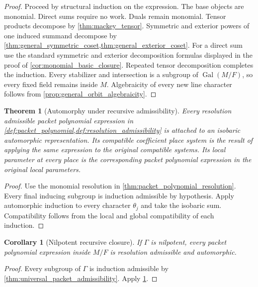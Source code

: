 \documentclass{aomart}
\newtheorem{theorem}{Theorem}[section]
\newtheorem{corollary}[corollary]{Corollary}
\theoremstyle{definition}
\theoremstyle{remark}
\newcommand{\Gal}{\operatorname{Gal}}
\begin{document}
\begin{proof}
Proceed by structural induction on the expression. The base objects are monomial. Direct sums require no work. Duals remain monomial. Tensor products decompose by \cref{thm:mackey_tensor}. Symmetric and exterior powers of one induced summand decompose by \cref{thm:general_symmetric_coset,thm:general_exterior_coset}. For a direct sum use the standard symmetric and exterior decomposition formulas displayed in the proof of \cref{cor:monomial_basic_closure}. Repeated tensor decomposition completes the induction. Every stabilizer and intersection is a subgroup of \(\Gal(M/F)\), so every fixed field remains inside \(M\). Algebraicity of every new line character follows from \cref{prop:general_orbit_algebraicity}.
\end{proof}

\begin{theorem}[Automorphy under recursive admissibility]\label{thm:packet_polynomial_automorphy}
Every resolution admissible packet polynomial expression in \cref{def:packet_polynomial,def:resolution_admissibility} is attached to an isobaric automorphic representation. Its compatible coefficient place system is the result of applying the same expression to the original compatible systems. Its local parameter at every place is the corresponding packet polynomial expression in the original local parameters.
\end{theorem}

\begin{proof}
Use the monomial resolution in \cref{thm:packet_polynomial_resolution}. Every final inducing subgroup is induction admissible by hypothesis. Apply automorphic induction to every character \(\theta_j\) and take the isobaric sum. Compatibility follows from the local and global compatibility of each induction.
\end{proof}

\begin{corollary}[Nilpotent recursive closure]\label{cor:nilpotent_recursive_closure}
If \(\Gamma\) is nilpotent, every packet polynomial expression inside \(M/F\) is resolution admissible and automorphic.
\end{corollary}

\begin{proof}
Every subgroup of \(\Gamma\) is induction admissible by \cref{thm:universal_packet_admissibility}. Apply \cref{thm:packet_polynomial_automorphy}.
\end{proof}
\end{document}
